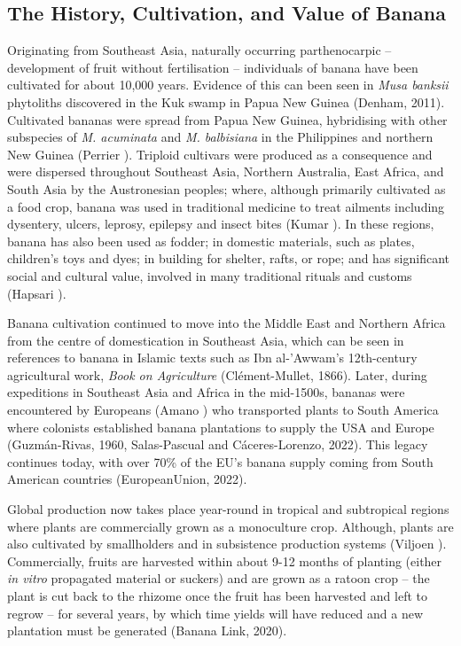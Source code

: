 \subsection{The History, Cultivation, and Value of Banana}

Originating from Southeast Asia, naturally occurring parthenocarpic – development of fruit without fertilisation – individuals of banana have been cultivated for about 10,000 years. Evidence of this can been seen in \textit{Musa banksii} phytoliths discovered in the Kuk swamp in Papua New Guinea (Denham, 2011). Cultivated bananas were spread from Papua New Guinea, hybridising with other subspecies of \textit{M. acuminata} and \textit{M. balbisiana} in the Philippines and northern New Guinea (Perrier ). Triploid cultivars were produced as a consequence and were dispersed throughout Southeast Asia, Northern Australia, East Africa, and South Asia by the Austronesian peoples; where, although primarily cultivated as a food crop, banana was used in traditional medicine to treat ailments including dysentery, ulcers, leprosy, epilepsy and insect bites (Kumar ). In these regions, banana has also been used as fodder; in domestic materials, such as plates, children’s toys and dyes; in building for shelter, rafts, or rope; and has significant social and cultural value, involved in many traditional rituals and customs (Hapsari ).  

Banana cultivation continued to move into the Middle East and Northern Africa from the centre of domestication in Southeast Asia, which can be seen in references to banana in Islamic texts such as Ibn al-'Awwam's 12th-century agricultural work, \textit{Book on Agriculture} (Clément-Mullet, 1866). Later, during expeditions in Southeast Asia and Africa in the mid-1500s, bananas were encountered by Europeans (Amano ) who transported plants to South America where colonists established banana plantations to supply the USA and Europe (Guzmán-Rivas, 1960, Salas-Pascual and Cáceres-Lorenzo, 2022). This legacy continues today, with over 70\% of the EU’s banana supply coming from South American countries (EuropeanUnion, 2022).  

Global production now takes place year-round in tropical and subtropical regions where plants are commercially grown as a monoculture crop. Although, plants are also cultivated by smallholders and in subsistence production systems (Viljoen ). Commercially, fruits are harvested within about 9-12 months of planting (either\textit{ in vitro} propagated material or suckers) and are grown as a ratoon crop – the plant is cut back to the rhizome once the fruit has been harvested and left to regrow – for several years, by which time yields will have reduced and a new plantation must be generated (Banana Link, 2020). 


